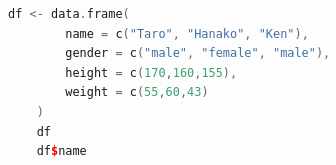 \begin{lstlisting}[language=c++,label={code:05_07},caption={DataFrame}]
	df <- data.frame(
		name = c("Taro", "Hanako", "Ken"),
		gender = c("male", "female", "male"),
		height = c(170,160,155),
		weight = c(55,60,43)
	)
	df
	df$name
\end{lstlisting}
